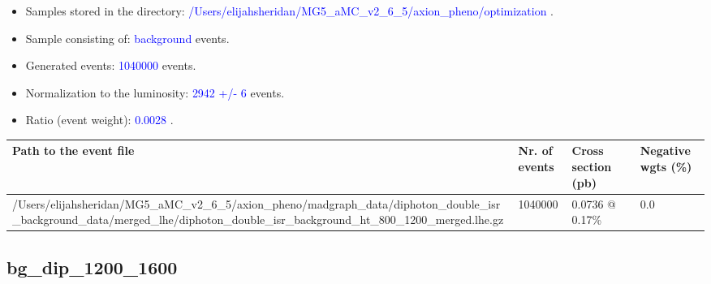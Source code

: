 \documentclass[a4paper, 10pt]{article}
\begin{document}
\begin{itemize}
  \item Samples stored in the directory: \textcolor{blue}{/\-Users/\-elijahsheridan/\-MG5\_aMC\_v2\_6\_5/\-axion\_pheno/\-optimization} .
   \item Sample consisting of: \textcolor{blue}{background}  events.
   \item Generated events: \textcolor{blue}{1040000 }  events.
   \item Normalization to the luminosity: \textcolor{blue}{2942}\textcolor{blue}{ +/\-- }\textcolor{blue}{6 }  events.
   \item Ratio (event weight): \textcolor{blue}{0.0028 } .  
 
\end{itemize}
\begin{table}[H]
  \begin{center}
    \begin{tabular}{|m{55.0mm}|m{25.0mm}|m{30.0mm}|m{30.0mm}|}
      \hline
      {\cellcolor{yellow}         Path to the event file}& {\cellcolor{yellow}         Nr. of events}& {\cellcolor{yellow}         Cross section (pb)}& {\cellcolor{yellow}         Negative wgts (\%)}\\
      \hline
      {\cellcolor{white}          /\-Users/\-elijahsheridan/\-MG5\_aMC\_v2\_6\_5/\-axion\_pheno/\-madgraph\_data/\-diphoton\_double\_isr\_background\_data/\-merged\_lhe/\-diphoton\_double\_isr\_background\_ht\_800\_1200\_merged.lhe.gz}& {\cellcolor{white}          1040000}& {\cellcolor{white}          0.0736 @ 0.17\%}& {\cellcolor{white}          0.0}\\
\hline
    \end{tabular}
  \end{center}
\end{table}

\subsection{ bg\_dip\_1200\_1600}
\end{document}
